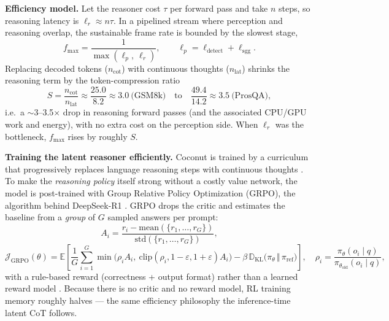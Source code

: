 \documentclass[10pt,letterpaper]{article}
\begin{document}
\textbf{Efficiency model.} Let the reasoner cost $\tau$ per forward pass and take $n$ steps, so
reasoning latency is $\ell_r \approx n\tau$. In a pipelined stream where perception and reasoning
overlap, the sustainable frame rate is bounded by the slowest stage,
\begin{equation}
f_{\max} = \frac{1}{\max(\ell_p,\ \ell_r)}, \qquad \ell_p = \ell_{\text{detect}} + \ell_{\text{sgg}} .
\end{equation}
Replacing decoded tokens ($n_{\text{cot}}$) with continuous thoughts ($n_{\text{lat}}$) shrinks the
reasoning term by the token-compression ratio
\begin{equation}
S = \frac{n_{\text{cot}}}{n_{\text{lat}}} \approx \frac{25.0}{8.2}\approx 3.0\ \text{(GSM8k)}
   \quad\text{to}\quad \frac{49.4}{14.2}\approx 3.5\ \text{(ProsQA)},
\end{equation}
i.e.\ a $\sim$3--3.5$\times$ drop in reasoning forward passes (and the associated CPU/GPU work and
energy), with no extra cost on the perception side. When $\ell_r$ was the bottleneck, $f_{\max}$
rises by roughly $S$.

\textbf{Training the latent reasoner efficiently.} Coconut is trained by a curriculum that
progressively replaces language reasoning steps with continuous thoughts \cite{hao2024}. To make
the \emph{reasoning policy} itself strong without a costly value network, the model is post-trained
with Group Relative Policy Optimization (GRPO), the algorithm behind DeepSeek-R1
\cite{deepseek2025}. GRPO drops the critic and estimates the baseline from a \emph{group} of $G$
sampled answers per prompt:
\begin{equation}
A_i = \frac{r_i - \mathrm{mean}(\{r_1,\dots,r_G\})}{\mathrm{std}(\{r_1,\dots,r_G\})},
\end{equation}
\begin{equation}
\mathcal{J}_{\text{GRPO}}(\theta) = \mathbb{E}\!\left[\frac{1}{G}\sum_{i=1}^{G}
  \min\!\Big(\rho_i A_i,\ \mathrm{clip}(\rho_i, 1-\varepsilon, 1+\varepsilon)A_i\Big)
  - \beta\,\mathbb{D}_{\text{KL}}\!\big(\pi_\theta \,\Vert\, \pi_{\text{ref}}\big)\right],
\quad \rho_i = \frac{\pi_\theta(o_i\mid q)}{\pi_{\theta_{\text{old}}}(o_i\mid q)},
\end{equation}
with a rule-based reward (correctness + output format) rather than a learned reward model
\cite{deepseek2025}. Because there is no critic and no reward model, RL training memory roughly
halves --- the same efficiency philosophy the inference-time latent CoT follows.
\end{document}

